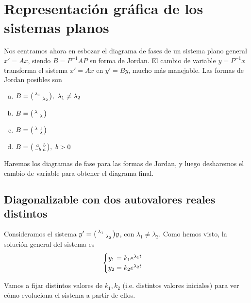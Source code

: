 \documentclass[../ecuaciones_diferenciales.tex]{subfiles}
\begin{document}
\section{Representación gráfica de los sistemas planos}

Nos centramos ahora en esbozar el diagrama de fases de un sistema plano general
\(x' = Ax\), siendo \(B = P^{-1}AP\) su forma de Jordan. El cambio de variable
\(y = P^{-1}x\) transforma el sistema \(x' = Ax\) en \(y' = By\), mucho más
manejable. Las formas de Jordan posibles son

\begin{multicols}{2}
\begin{enumerate}[a)]
	\item \(B = \smat{\lambda_1 & \\ & \lambda_2},\ \lambda_1 \neq \lambda_2\)
	\item \(B = \smat{\lambda & \\ & \lambda}\)
	\item \(B = \smat{\lambda & 1 \\ & \lambda}\)
	\item \(B = \smat{a & b \\ -b & a},\ b>0\)
\end{enumerate}
\end{multicols}

Haremos los diagramas de fase para las formas de Jordan, y luego desharemos el
cambio de variable para obtener el diagrama final.

\subsection{Diagonalizable con dos autovalores reales distintos}

Consideramos el sistema \(y' = \smat{\lambda_1 & \\ & \lambda_2} y\), con
\(\lambda_1 \neq \lambda_2\). Como hemos visto, la solución general del sistema
es
\[\begin{cases}
	y_1 = k_1e^{\lambda_1 t} \\
	y_2 = k_2e^{\lambda_2 t}\end{cases}\]

Vamos a fijar distintos valores de \(k_1,k_2\) (i.e. distintos valores
iniciales) para ver cómo evoluciona el sistema a partir de ellos.
\end{document}
